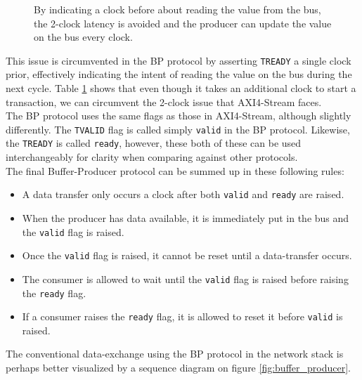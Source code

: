 \begin{figure}
\begin{minipage}[b]{0.4\textwidth}
\begin{tabular}{p{0.9cm} | p{2.4cm} | p{2.4cm}}
\bottomrule
\end{tabular}
	\caption{By indicating a clock before about reading the value from the
	  bus, the 2-clock latency is avoided and the producer can update the
	  value on the bus every clock.}
\label{tab:bp_stream_latency}
\end{minipage}
\end{figure}

This issue is circumvented in the BP protocol by asserting \texttt{TREADY} a
single clock prior, effectively indicating the intent of reading the value on
the bus during the next cycle. Table \ref{tab:bp_stream_latency} shows that
even though it takes an additional clock to start a transaction, we can
circumvent the 2-clock issue that AXI4-Stream faces.\\

The BP protocol uses the same flags as those in AXI4-Stream, although slightly
differently. The \texttt{TVALID} flag is called simply \texttt{valid} in the
BP protocol. Likewise, the \texttt{TREADY} is called \texttt{ready}, however,
these both of these can be used interchangeably for clarity when comparing
against other protocols.\\

The final Buffer-Producer protocol can be summed up in these following
rules:
\begin{itemize}
	\item A data transfer only occurs a clock after both \texttt{valid} and \texttt{ready}
		are raised.
	\item When the producer has data available, it is immediately put in
		the bus and the \texttt{valid} flag is raised.
	\item Once the \texttt{valid} flag is raised, it cannot be reset until
		a data-transfer occurs.
	\item The consumer is allowed to wait until the \texttt{valid} flag is
		raised before raising the \texttt{ready} flag.
	\item If a consumer raises the \texttt{ready} flag, it is allowed to
		reset it before \texttt{valid} is raised.
\end{itemize}

The conventional data-exchange using the BP protocol in the network
stack is perhaps better visualized by a sequence diagram on figure
\ref{fig:buffer_producer}.


